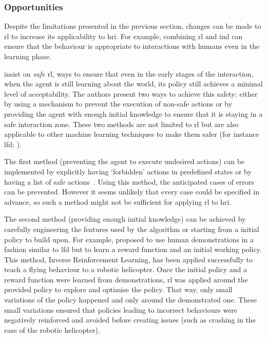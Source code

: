 	\subsubsection{Opportunities}  
	Despite the limitations presented in the previous section, changes can be made to \gls{rl} to increase its applicability to \gls{hri}. For example, combining \gls{rl} and \gls{iml} can ensure that the behaviour is appropriate to interactions with humans even in the learning phase.
	
	\cite{garcia2015comprehensive} insist on \textit{safe} \gls{rl}, ways to ensure that even in the early stages of the interaction, when the agent is still learning about the world, its policy still achieves a minimal level of acceptability. The authors present two ways to achieve this safety: either by using a mechanism to prevent the execution of non-safe actions or by providing the agent with enough initial knowledge to ensure that it is staying in a safe interaction zone. These two methods are not limited to \gls{rl} but are also applicable to other machine learning techniques to make them safer (for instance \gls{lfd}; \citealt{billard2008robot}). 
	
	The first method (preventing the agent to execute undesired actions) can be implemented by explicitly having `forbidden' actions in predefined states or by having a list of safe actions~\citep{alshiekh2017safe}. Using this method, the anticipated cases of errors can be prevented. However it seems unlikely that every case could be specified in advance, so such a method might not be sufficient for applying \gls{rl} to \gls{hri}. %
	
	The second method (providing enough initial knowledge) can be achieved by carefully engineering the features used by the algorithm or starting from a initial policy to build upon. For example, \cite{abbeel2004apprenticeship} proposed to use human demonstrations in a fashion similar to \gls{lfd} but to learn a reward function and an initial working policy. This method, Inverse Reinforcement Learning, has been applied successfully to teach a flying behaviour to a robotic helicopter. Once the initial policy and a reward function were learned from demonstrations, \gls{rl} was applied around the provided policy to explore and optimise the policy. That way, only small variations of the policy happened and only around the demonstrated one. These small variations ensured that policies leading to incorrect behaviours were negatively reinforced and avoided before creating issues (such as crashing in the case of the robotic helicopter). 
	
